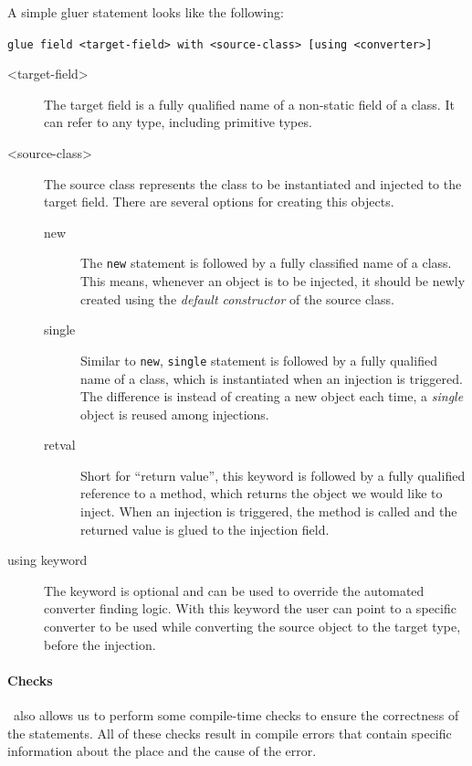 A simple gluer statement looks like the following:

\lstinline~glue field <target-field> with <source-class> [using <converter>]~

\begin{description}
\item[<target-field>] The target field is a fully qualified name of a non-static field of a class. 
It can refer to any type, including primitive types. 
\end{description}

\begin{description}
\item[<source-class>] The source class represents the class to be instantiated and injected to the target field. There are several options for creating this objects.
	\begin{description}
	\item[new] The \lstinline{new} statement is followed by a fully classified name of a class. This means, whenever an object is to be injected, it should be newly created using the \emph{default constructor} of the source class. 

	\item[single] Similar to \lstinline{new}, \lstinline{single} statement is followed by a fully qualified name of a class, which is instantiated when an injection is triggered. The difference is instead of creating a new object each time, a \emph{single} object is reused among injections.

	\item[retval] Short for ``return value'', this keyword is followed by a fully qualified reference to a method, which returns the object we would like to inject. When an injection is triggered, the method is called and the returned value is glued to the injection field.
	\end{description}
\item[using keyword] The  keyword is optional and can be used to override the automated converter finding logic. With this keyword the user can point to a specific converter to be used while converting the source object to the target type, before the injection. 
\end{description}

\paragraph{Checks} \gluer~also allows us to perform some compile-time checks to ensure the correctness of the  statements. 
All of these checks result in compile errors that contain specific information about the place and the cause of the error.

